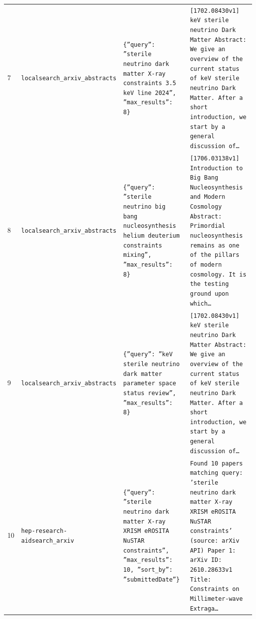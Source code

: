 \documentclass[11pt,a4paper]{article}
\begin{document}
\begin{longtable}{@{}p{}p{}p{}p{}@{}}
7 & \texttt{local}\newline\texttt{search\_\allowbreak{}arxiv\_\allowbreak{}abstracts} & \texttt{\{''query'':\allowbreak{} ''sterile neutrino dark matter X-ray constraints 3.5 keV line 2024'',\allowbreak{} ''max\_\allowbreak{}results'':\allowbreak{} 8\}\allowbreak{}} & \texttt{[1702.08430v1]\allowbreak{} keV sterile neutrino Dark Matter Abstract:\allowbreak{} We give an overview of the current status of keV sterile neutrino Dark Matter. After a short introduction,\allowbreak{} we start by a general discussion of\ldots{}\allowbreak{}} \\
8 & \texttt{local}\newline\texttt{search\_\allowbreak{}arxiv\_\allowbreak{}abstracts} & \texttt{\{''query'':\allowbreak{} ''sterile neutrino big bang nucleosynthesis helium deuterium constraints mixing'',\allowbreak{} ''max\_\allowbreak{}results'':\allowbreak{} 8\}\allowbreak{}} & \texttt{[1706.03138v1]\allowbreak{} Introduction to Big Bang Nucleosynthesis and Modern Cosmology Abstract:\allowbreak{} Primordial nucleosynthesis remains as one of the pillars of modern cosmology. It is the testing ground upon which\ldots{}\allowbreak{}} \\
9 & \texttt{local}\newline\texttt{search\_\allowbreak{}arxiv\_\allowbreak{}abstracts} & \texttt{\{''query'':\allowbreak{} ''keV sterile neutrino dark matter parameter space status review'',\allowbreak{} ''max\_\allowbreak{}results'':\allowbreak{} 8\}\allowbreak{}} & \texttt{[1702.08430v1]\allowbreak{} keV sterile neutrino Dark Matter Abstract:\allowbreak{} We give an overview of the current status of keV sterile neutrino Dark Matter. After a short introduction,\allowbreak{} we start by a general discussion of\ldots{}\allowbreak{}} \\
10 & \texttt{hep-research-aid}\newline\texttt{search\_\allowbreak{}arxiv} & \texttt{\{''query'':\allowbreak{} ''sterile neutrino dark matter X-ray XRISM eROSITA NuSTAR constraints'',\allowbreak{} ''max\_\allowbreak{}results'':\allowbreak{} 10,\allowbreak{} ''sort\_\allowbreak{}by'':\allowbreak{} ''submittedDate''\}\allowbreak{}} & \texttt{Found 10 papers matching query:\allowbreak{} 'sterile neutrino dark matter X-ray XRISM eROSITA NuSTAR constraints' (source:\allowbreak{} arXiv API)\allowbreak{}  Paper 1:\allowbreak{} arXiv ID:\allowbreak{} 2610.28633v1 Title:\allowbreak{} Constraints on Millimeter-wave Extraga\ldots{}\allowbreak{}} \\

\end{longtable}
\end{document}

